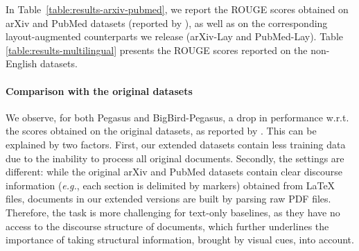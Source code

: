                             

In Table~\ref{table:results-arxiv-pubmed}, we report the ROUGE scores obtained on arXiv and PubMed datasets (reported by \citet{zaheer2020big}), as well as on the corresponding layout-augmented counterparts we release (arXiv-Lay and PubMed-Lay). Table \ref{table:results-multilingual} presents the ROUGE scores reported on the non-English datasets.

\paragraph{Comparison with the original datasets} We observe, for both Pegasus and BigBird-Pegasus, a drop in performance w.r.t. the scores obtained on the original datasets, as reported by \citet{zaheer2020big}. This can be explained by two factors. First, our extended datasets contain less training data due to the inability to process all original documents. Secondly, the settings are different: while the original arXiv and PubMed datasets contain clear discourse information (\textit{e.g.}, each section is delimited by markers) obtained from \LaTeX~ files, documents in our extended versions are built by parsing raw PDF files. Therefore, the task is more challenging for text-only baselines, as they have no access to the discourse structure of documents, which further underlines the importance of taking structural information, brought by visual cues, into account.


